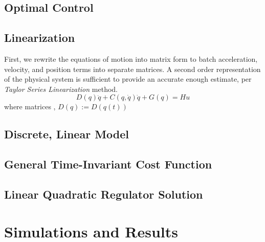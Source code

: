 \documentclass[journal]{IEEEtran}
\begin{document}
\subsection{Optimal Control}

\subsection{Linearization}
First, we rewrite the equations of motion into matrix form to batch acceleration,
velocity, and position terms into separate matrices. A second order representation
of the physical system is sufficient to provide an accurate enough estimate,
per \emph{Taylor Series Linearization} method.
\begin{equation}
D(q) \ddot{q} + C(q, \dot{q}) \dot{q} + G(q) = Hu
\end{equation}
where matrices \(\), \(D(q):= D(q(t))\)

\subsection{Discrete, Linear Model}

\subsection{General Time-Invariant Cost Function}

\subsection{Linear Quadratic Regulator Solution}

\section{Simulations and Results}






%
%
\end{document}
